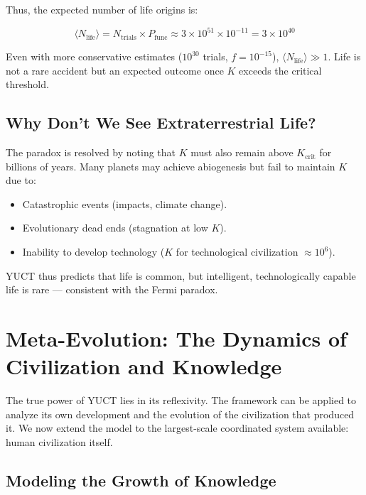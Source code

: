 \documentclass[12pt,a4paper]{article}
\theoremstyle{remark}
\newcommand{\Keffcrit}{K_{\mathrm{crit}}}
\newcommand{\Ntrials}{N_{\mathrm{trials}}}
\newcommand{\Nlife}{\langle N_{\mathrm{life}}\rangle}
\begin{document}
	Thus, the expected number of life origins is:
	
	\begin{equation}
		\Nlife = \Ntrials \times P_{\text{func}} \approx 3 \times 10^{51} \times 10^{-11} = 3 \times 10^{40}
		\label{eq:Nlife}
	\end{equation}
	
	Even with more conservative estimates ($10^{30}$ trials, $f=10^{-15}$), $\Nlife \gg 1$. Life is not a rare accident but an expected outcome once $K$ exceeds the critical threshold.
	
	\subsection{Why Don't We See Extraterrestrial Life?}
	
	The paradox is resolved by noting that $K$ must also remain above $\Keffcrit$ for billions of years. Many planets may achieve abiogenesis but fail to maintain $K$ due to:
	
	\begin{itemize}
		\item Catastrophic events (impacts, climate change).
		\item Evolutionary dead ends (stagnation at low $K$).
		\item Inability to develop technology ($K$ for technological civilization $\approx 10^6$).
	\end{itemize}
	
	YUCT thus predicts that life is common, but intelligent, technologically capable life is rare — consistent with the Fermi paradox.
	
	\section{Meta-Evolution: The Dynamics of Civilization and Knowledge}
	\label{sec:meta-evolution}
	
	The true power of YUCT lies in its reflexivity. The framework can be applied to analyze its own development and the evolution of the civilization that produced it. We now extend the model to the largest-scale coordinated system available: human civilization itself.
	
	\subsection{Modeling the Growth of Knowledge}
	
\end{document}
